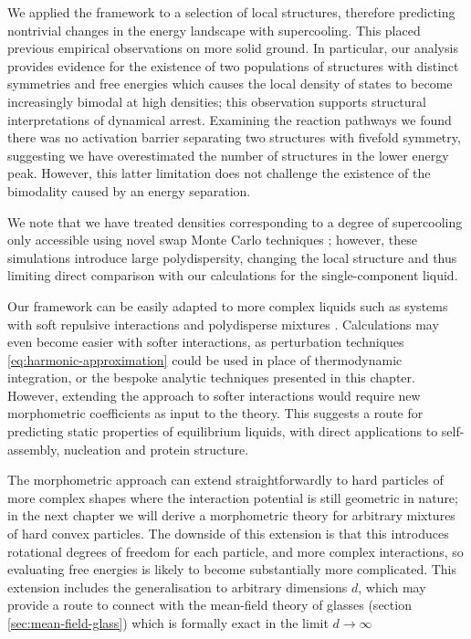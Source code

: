 \documentclass[11pt,twoside]{report}
\begin{document}
We applied the framework to a selection of local structures, therefore predicting nontrivial changes in the energy landscape with supercooling.
This placed previous empirical observations on more solid ground.
In particular, our analysis provides evidence for the existence of two populations of structures with distinct symmetries and free energies which causes the local density of states to become increasingly bimodal at high densities; this observation supports structural interpretations of dynamical arrest.
Examining the reaction pathways we found there was no activation barrier separating two structures with fivefold symmetry, suggesting we have overestimated the number of structures in the lower energy peak.
However, this latter limitation does not challenge the existence of the bimodality caused by an energy separation.

We note that we have treated densities corresponding to a degree of supercooling only accessible using novel swap Monte Carlo techniques \cite{BerthierPRL2016}; however, these simulations introduce large polydispersity, changing the local structure \cite{CoslovichJPCM2018} and thus limiting direct comparison with our calculations for the single-component liquid.

Our framework can be easily adapted to more complex liquids such as systems with soft repulsive interactions and polydisperse mixtures \cite{KodamaJCP2011}.
Calculations may even become easier with softer interactions, as perturbation techniques \eqref{eq:harmonic-approximation} could be used in place of thermodynamic integration, or the bespoke analytic techniques presented in this chapter.
However, extending the approach to softer interactions would require new morphometric coefficients as input to the theory.
This suggests a route for predicting static properties of equilibrium liquids, with direct applications to self-assembly, nucleation and protein structure.

The morphometric approach can extend straightforwardly to hard particles of more complex shapes where the interaction potential is still geometric in nature; in the next chapter we will derive a morphometric theory for arbitrary mixtures of hard convex particles.
The downside of this extension is that this introduces rotational degrees of freedom for each particle, and more complex interactions, so evaluating free energies is likely to become substantially more complicated.
This extension includes the generalisation to arbitrary dimensions $d$, which may provide a route to connect with the mean-field theory of glasses (section \ref{sec:mean-field-glass}) which is formally exact in the limit $d \to \infty$
\end{document}
